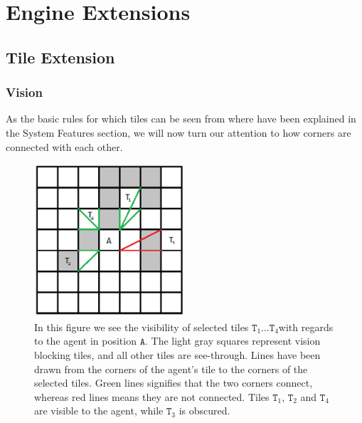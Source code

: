 
\section{Engine Extensions}


\subsection{Tile Extension\label{sub:ImplementationTileExtension}}


\subsubsection*{Vision}

As the basic rules for which tiles can be seen from where have been
explained in the System Features section, we will now turn our attention
to how corners are connected with each other. 

\begin{figure}
\begin{centering}
\includegraphics[width=0.5\textwidth]{tilemapVision}
\par\end{centering}

\caption{In this figure we see the visibility of selected tiles $\mathtt{T}_{1}\dots\mathtt{T}_{4}$with
regards to the agent in position $\mathtt{A}$. The light gray squares
represent vision blocking tiles, and all other tiles are see-through.
Lines have been drawn from the corners of the agent's tile to the
corners of the selected tiles. Green lines signifies that the two
corners connect, whereas red lines means they are not connected. Tiles
$\mathtt{T}_{1}$, $\mathtt{T}_{2}$ and $\mathtt{T}_{4}$ are visible
to the agent, while $\mathtt{T}_{3}$ is obscured.\label{fig:TileMapVision}}


\end{figure}


